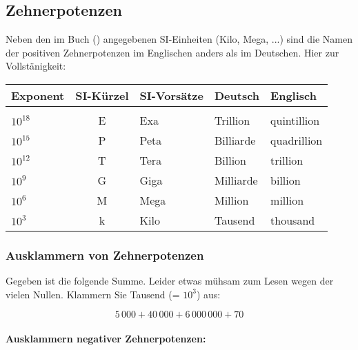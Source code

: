 \subsection{Zehnerpotenzen}

Neben den im Buch () angegebenen SI-Einheiten (Kilo, Mega, ...) sind die
Namen der positiven Zehnerpotenzen im Englischen anders als im
Deutschen. Hier zur Vollstänigkeit:

\begin{tabular}{lclll}
Exponent   & SI-Kürzel & SI-Vorsätze & Deutsch & Englisch\\
\hline\\
$10^{18}$  & E         & Exa         & Trillion  & quintillion\\
$10^{15}$  & P         & Peta        & Billiarde & quadrillion\\
$10^{12}$  & T         & Tera        & Billion   & trillion\\
$10^{9}$   & G         & Giga        & Milliarde & billion\\
$10^{6}$   & M         & Mega        & Million   & million\\
$10^{3}$   & k         & Kilo        & Tausend   & thousand\\
\end{tabular}


\newpage


\subsubsection{Ausklammern von Zehnerpotenzen}
Gegeben ist die folgende Summe. Leider etwas mühsam zum Lesen wegen der vielen Nullen. Klammern Sie Tausend (= $10^3$) aus:

$$5\,000 + 40\,000 + 6\,000\,000 + 70$$


\paragraph{Ausklammern negativer Zehnerpotenzen:}
\,\\

